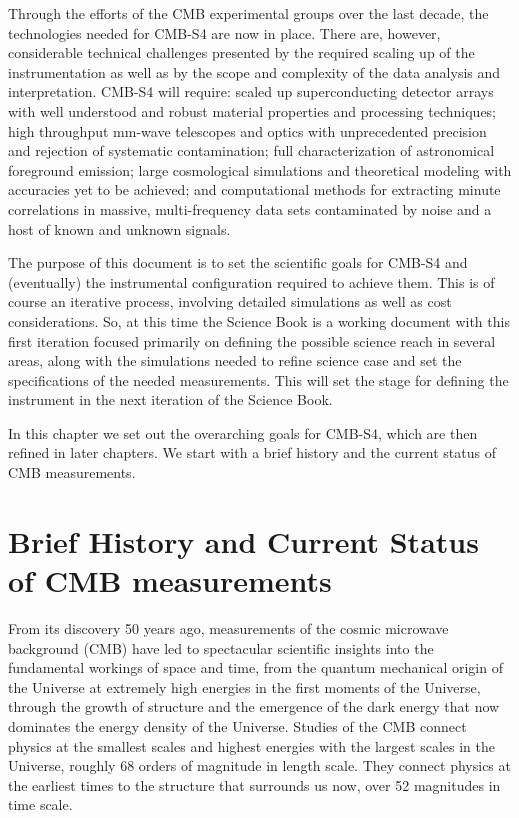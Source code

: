 Through the efforts of the CMB experimental groups over the last decade, the technologies needed for CMB-S4 are now in place. There are, however, considerable technical challenges presented by the required scaling up of the instrumentation as well as by the scope and complexity of the data analysis and interpretation.  CMB-S4 will require: scaled up superconducting detector arrays with well understood and robust material properties and processing techniques; high throughput mm-wave telescopes and optics with unprecedented precision and rejection of systematic contamination; full characterization of astronomical foreground emission; large cosmological simulations and theoretical modeling with accuracies yet to be achieved; and computational methods for extracting minute correlations in massive, multi-frequency data sets contaminated by noise and a host of known and unknown signals. 

The purpose of this document is to set the scientific goals for CMB-S4 and (eventually) the instrumental configuration required to achieve them.  This is of course an iterative process, involving detailed simulations as well as cost considerations. So, at this time the Science Book is a working document with this first iteration focused primarily on defining the possible science reach in several areas, along with the simulations needed to refine science case and set the specifications of the needed measurements. This will set the stage for defining the instrument  in the next iteration of the Science Book. 

In this chapter we set out the overarching goals for CMB-S4, which are then refined in later chapters.  We start with a brief history and the current status of CMB measurements. 


\section{Brief History and Current Status of CMB measurements}
\label{sec:background}

From its discovery 50 years ago, measurements of the cosmic microwave background (CMB) have led to spectacular scientific insights into the fundamental workings of space and time, from the quantum mechanical origin of the Universe at extremely high energies in the first moments of the Universe, through the growth of structure and the emergence of the dark energy that now dominates the energy density of the Universe. Studies of the CMB connect physics at the smallest scales and highest energies with the largest scales in the Universe, roughly 68 orders of magnitude in length scale. They connect physics at the earliest times to the structure that surrounds us now, over 52 magnitudes in time scale. 

